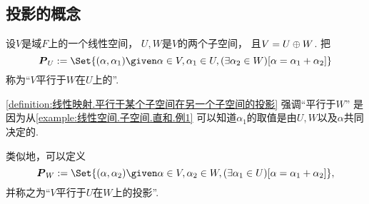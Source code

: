 \subsection{投影的概念}
\begin{definition}\label{definition:线性映射.平行于某个子空间在另一个子空间的投影}
设\(V\)是域\(F\)上的一个线性空间，
\(U,W\)是\(V\)的两个子空间，
且\(V=U \oplus W\).
把\[
	\vb{P}_U
	\defeq
	\Set{
		(\alpha,\alpha_1)
		\given
		\alpha \in V,
		\alpha_1 \in U,
		(\exists \alpha_2 \in W)
		[\alpha=\alpha_1+\alpha_2]
	}
\]
称为“\(V\)平行于\(W\)在\(U\)上的”.
\end{definition}
\begin{remark}
\cref{definition:线性映射.平行于某个子空间在另一个子空间的投影}
强调“平行于\(W\)”
是因为从\cref{example:线性空间.子空间.直和.例1}
可以知道\(\alpha_1\)的取值是由\(U,W\)以及\(\alpha\)共同决定的.
\end{remark}
\begin{remark}
类似地，可以定义\[
	\vb{P}_W
	\defeq
	\Set{
		(\alpha,\alpha_2)
		\given
		\alpha \in V,
		\alpha_2 \in W,
		(\exists \alpha_1 \in U)
		[\alpha=\alpha_1+\alpha_2]
	},
\]
并称之为“\(V\)平行于\(U\)在\(W\)上的投影”.
\end{remark}

